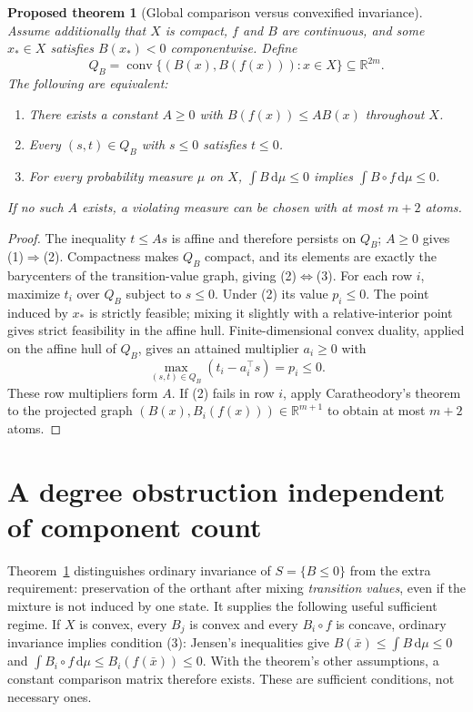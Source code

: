 \documentclass[10pt,letterpaper]{article}
\newtheorem{theorem}{Proposed theorem}
\newcommand{\R}{\mathbb R}
\newcommand{\co}{\operatorname{conv}}
\newcommand{\dd}{\,\mathrm d}
\begin{document}
\begin{theorem}[Global comparison versus convexified invariance]\label{th:comparison}
Assume additionally that $X$ is compact, $f$ and $B$ are continuous, and some $x_*\in X$ satisfies $B(x_*)<0$ componentwise. Define
\[
 Q_B=\co\{(B(x),B(f(x))):x\in X\}\subseteq\R^{2m}.
\]
The following are equivalent:
\begin{enumerate}
\item There exists a constant $A\geq0$ with $B(f(x))\leq AB(x)$ throughout $X$.
\item Every $(s,t)\in Q_B$ with $s\leq0$ satisfies $t\leq0$.
\item For every probability measure $\mu$ on $X$, $\int B\dd\mu\leq0$ implies $\int B\circ f\dd\mu\leq0$.
\end{enumerate}
If no such $A$ exists, a violating measure can be chosen with at most $m+2$ atoms.
\end{theorem}
\begin{proof}
The inequality $t\leq As$ is affine and therefore persists on $Q_B$; $A\geq0$ gives (1)$\Rightarrow$(2). Compactness makes $Q_B$ compact, and its elements are exactly the barycenters of the transition-value graph, giving (2)$\Leftrightarrow$(3). For each row $i$, maximize $t_i$ over $Q_B$ subject to $s\leq0$. Under (2) its value $p_i\leq0$. The point induced by $x_*$ is strictly feasible; mixing it slightly with a relative-interior point gives strict feasibility in the affine hull. Finite-dimensional convex duality, applied on the affine hull of $Q_B$, gives an attained multiplier $a_i\geq0$ with
\[
 \max_{(s,t)\in Q_B}(t_i-a_i^\top s)=p_i\leq0.
\]
These row multipliers form $A$. If (2) fails in row $i$, apply Caratheodory's theorem to the projected graph $(B(x),B_i(f(x)))\in\R^{m+1}$ to obtain at most $m+2$ atoms.
\end{proof}

\newpage
\section{A degree obstruction independent of component count}
Theorem~\ref{th:comparison} distinguishes ordinary invariance of $S=\{B\leq0\}$ from the extra requirement: preservation of the orthant after mixing \emph{transition values}, even if the mixture is not induced by one state. It supplies the following useful sufficient regime. If $X$ is convex, every $B_j$ is convex and every $B_i\circ f$ is concave, ordinary invariance implies condition (3): Jensen's inequalities give $B(\bar x)\leq\int B\dd\mu\leq0$ and $\int B_i\circ f\dd\mu\leq B_i(f(\bar x))\leq0$. With the theorem's other assumptions, a constant comparison matrix therefore exists. These are sufficient conditions, not necessary ones.
\end{document}
